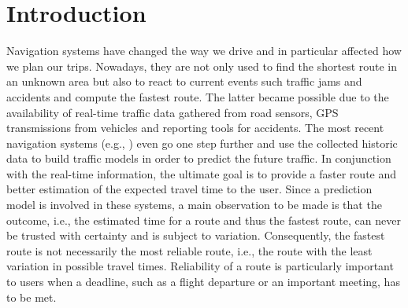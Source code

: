 \vspace{-0.4cm}
\section{Introduction}

Navigation systems have changed the way we drive and in particular affected how we plan our trips. Nowadays, they are not only used to find the shortest route in an unknown area but also to react to current events such traffic jams and accidents and compute the fastest route. The latter became possible due to the availability of real-time traffic data gathered from road sensors, GPS transmissions from vehicles and reporting tools for accidents. The most recent navigation systems (e.g., \cite{Pan13}) even go one step further and use the collected historic data to build traffic models in order to predict the future traffic. In conjunction with the real-time information, the ultimate goal is to provide a faster route and better estimation of the expected travel time to the user. Since a prediction model is involved in these systems, a main observation to be made is that the outcome, i.e., the estimated time for a route and thus the fastest route, can never be trusted with certainty and is subject to variation. Consequently, the fastest route is not necessarily the most reliable route, i.e., the route with the least variation in possible travel times. Reliability of a route is particularly important to users when a deadline, such as a flight departure or an important meeting, has to be met. 

